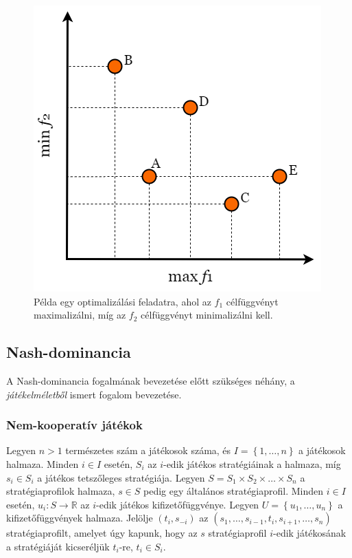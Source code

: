 \begin{figure}[t]
  \centering
  \includegraphics[scale=0.5]{images/pareto_dominance.png}
  \caption{
    Példa egy optimalizálási feladatra, ahol az $f_1$ célfüggvényt maximalizálni, míg az $f_2$ célfüggvényt minimalizálni kell.
  }
  \label{fig:PARETO_DOMINANCE}
\end{figure}


\subsection{Nash-dominancia}
A Nash-dominancia fogalmának bevezetése előtt szükséges néhány, a \textit{játékelméletből} \cite{von2007theory} ismert fogalom bevezetése.


\subsubsection{Nem-kooperatív játékok}
Legyen $n > 1$ természetes szám a játékosok száma, és $I = \left\{ 1, \dots, n \right\}$ a játékosok halmaza.
Minden $i \in I$ esetén, $S_i$ az $i$-edik játékos stratégiáinak a halmaza, míg $s_i \in S_i$ a játékos tetszőleges stratégiája.
Legyen $S = S_1 \times S_2 \times \dotsc \times S_n$ a stratégiaprofilok halmaza, $s \in S$ pedig egy általános stratégiaprofil.
Minden $i \in I$ esetén, $u_i \colon S \to \mathbb{R}$ az $i$-edik játékos kifizetőfüggvénye.
Legyen $U = \left\{ u_1, \dots, u_n \right\}$ a kifizetőfüggvények halmaza.
Jelölje $\left( t_i, s_{-i} \right)$ az $\left( s_1, \dots, s_{i-1}, t_i, s_{i+1}, \dots, s_n \right)$ stratégiaprofilt,
amelyet úgy kapunk, hogy az $s$ stratégiaprofil $i$-edik játékosának a stratégiáját kicseréljük $t_i$-re, $t_i \in S_i$.


